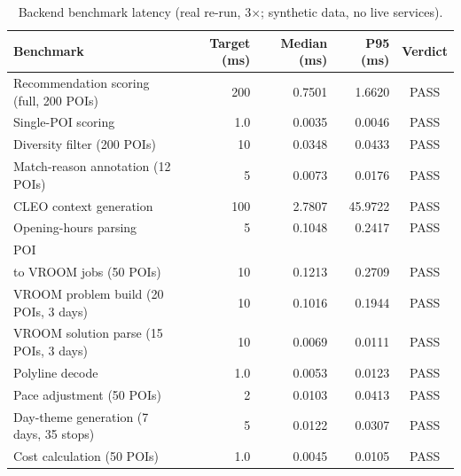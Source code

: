 \begin{table}[h]\centering\small
\caption{Backend benchmark latency (real re-run, 3$\times$; synthetic data, no live services).}
\label{tab:latency}\begin{tabular}{lrrrc}
\toprule Benchmark & Target (ms) & Median (ms) & P95 (ms) & Verdict \\ \midrule
Recommendation scoring (full, 200 POIs) & 200 & 0.7501 & 1.6620 & PASS \\
Single-POI scoring & 1.0 & 0.0035 & 0.0046 & PASS \\
Diversity filter (200 POIs) & 10 & 0.0348 & 0.0433 & PASS \\
Match-reason annotation (12 POIs) & 5 & 0.0073 & 0.0176 & PASS \\
CLEO context generation & 100 & 2.7807 & 45.9722 & PASS \\
Opening-hours parsing & 5 & 0.1048 & 0.2417 & PASS \\
POI \\to VROOM jobs (50 POIs) & 10 & 0.1213 & 0.2709 & PASS \\
VROOM problem build (20 POIs, 3 days) & 10 & 0.1016 & 0.1944 & PASS \\
VROOM solution parse (15 POIs, 3 days) & 10 & 0.0069 & 0.0111 & PASS \\
Polyline decode & 1.0 & 0.0053 & 0.0123 & PASS \\
Pace adjustment (50 POIs) & 2 & 0.0103 & 0.0413 & PASS \\
Day-theme generation (7 days, 35 stops) & 5 & 0.0122 & 0.0307 & PASS \\
Cost calculation (50 POIs) & 1.0 & 0.0045 & 0.0105 & PASS \\
\bottomrule\end{tabular}\end{table}
